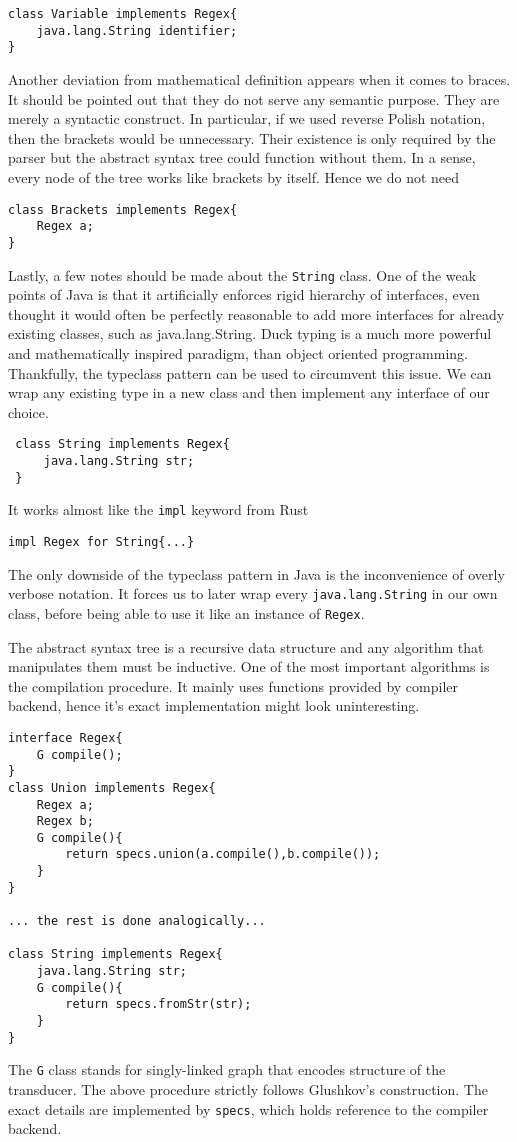 \begin{lstlisting}
class Variable implements Regex{
    java.lang.String identifier;
}
\end{lstlisting}
Another deviation from mathematical definition appears when it comes to braces. It should be pointed out that they do not serve any semantic purpose. They are merely a syntactic construct. In particular, if we used reverse Polish notation, then the brackets would be unnecessary. Their existence is only required by the parser but the abstract syntax tree could function without them. In a sense, every node of the tree works like brackets by itself. Hence we do not need
\begin{lstlisting}
class Brackets implements Regex{
    Regex a;
}
\end{lstlisting}
Lastly, a few notes should be made about the \texttt{String} class.
One of the weak points of Java
 is that it artificially enforces 
 rigid hierarchy of interfaces,
 even thought it would often be
 perfectly reasonable to
 add more interfaces
 for already existing classes, such as
 java.lang.String. 
 Duck typing is a much more powerful and
 mathematically inspired paradigm, than object oriented programming.
 Thankfully, the typeclass pattern can be used to circumvent this issue.
 We can wrap any existing type in a new class and then implement any
 interface of our choice.
 \begin{lstlisting}
 class String implements Regex{
     java.lang.String str;
 }
 \end{lstlisting}
It works almost like the \texttt{impl} keyword from Rust
 \begin{lstlisting}
impl Regex for String{...}
\end{lstlisting}
The only downside of the typeclass pattern in Java is the inconvenience of overly verbose notation. It forces us to later wrap every 
\texttt{java.lang.String} in our own class, before being able to use it like an instance of \texttt{Regex}.

The abstract syntax tree is a recursive data structure and any algorithm that manipulates them must be inductive. One of the most important  algorithms is the compilation procedure. It mainly uses functions provided by compiler backend, hence it's exact implementation might look uninteresting. 
\begin{lstlisting}
interface Regex{
    G compile();
}
class Union implements Regex{
    Regex a; 
    Regex b;
    G compile(){
        return specs.union(a.compile(),b.compile());
    }
}

... the rest is done analogically...

class String implements Regex{
    java.lang.String str;
    G compile(){
        return specs.fromStr(str);
    }
}
\end{lstlisting}
The \texttt{G} class stands for singly-linked graph that encodes structure of the transducer. The above procedure strictly follows Glushkov's construction.
The exact details are implemented by \texttt{specs}, which holds reference to the compiler backend. 

